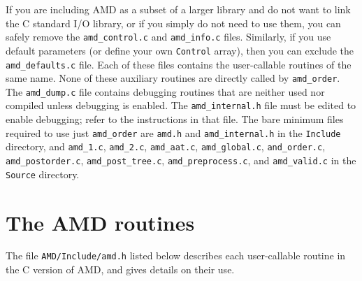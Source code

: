\documentclass[11pt]{article}
\begin{document}
If you are including AMD as a subset of a larger library and do not want
to link the C standard I/O library, or if you simply do not need to use
them, you can safely remove the {\tt amd\_control.c} and {\tt amd\_info.c}
files.  Similarly, if you use default parameters (or define your
own {\tt Control} array), then you can exclude the {\tt amd\_defaults.c}
file.
Each of these files contains the user-callable routines of the same
name.  None of these auxiliary routines are directly called by
{\tt amd\_order}.
The {\tt amd\_dump.c} file contains debugging routines
that are neither used nor compiled unless debugging is enabled.
The {\tt amd\_internal.h} file must be edited to enable debugging;
refer to the instructions in that file.
The bare minimum files required to use just {\tt amd\_order} are
{\tt amd.h} and {\tt amd\_internal.h}
in the {\tt Include} directory,
and
{\tt amd\_1.c},
{\tt amd\_2.c},
{\tt amd\_aat.c},
{\tt amd\_global.c},
{\tt and\_order.c},
{\tt amd\_postorder.c},
{\tt amd\_post\_tree.c},
{\tt amd\_preprocess.c},
and
{\tt amd\_valid.c}
in the {\tt Source} directory.

\newpage
\section{The AMD routines}
\label{Primary}

The file {\tt AMD/Include/amd.h} listed below
describes each user-callable routine in the C version of AMD,
and gives details on their use.

{\footnotesize

}


\newpage



\end{document}
